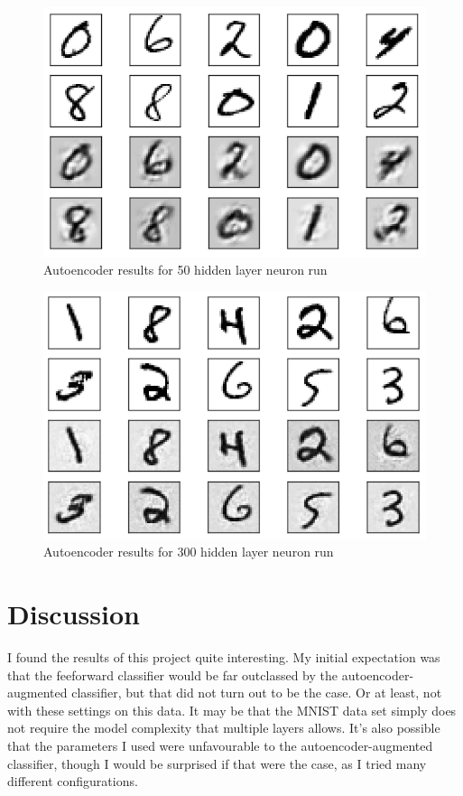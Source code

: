 \documentclass[english]{tktltiki}
\begin{document}
\begin{figure}[]
\centering
\caption{Autoencoder results for 50 hidden layer neuron run}
\label{AE-50-figure}
\includegraphics[scale=0.75]{AE-50-Test-Crop}
\end{figure}

\begin{figure}[]
\centering
\caption{Autoencoder results for 300 hidden layer neuron run}
\label{AE-300-figure}
\includegraphics[scale=0.75]{AE-300-Test-Crop}
\end{figure}

\section{Discussion}
\label{sec:Discussion}

I found the results of this project quite interesting.  My initial expectation was that the feeforward classifier would be far outclassed by the autoencoder-augmented classifier, but that did not turn out to be the case.  Or at least, not with these settings on this data.  It may be that the MNIST data set simply does not require the model complexity that multiple layers allows.  It's also possible that the parameters I used were unfavourable to the autoencoder-augmented classifier, though I would be surprised if that were the case, as I tried many different configurations.  
\end{document}
